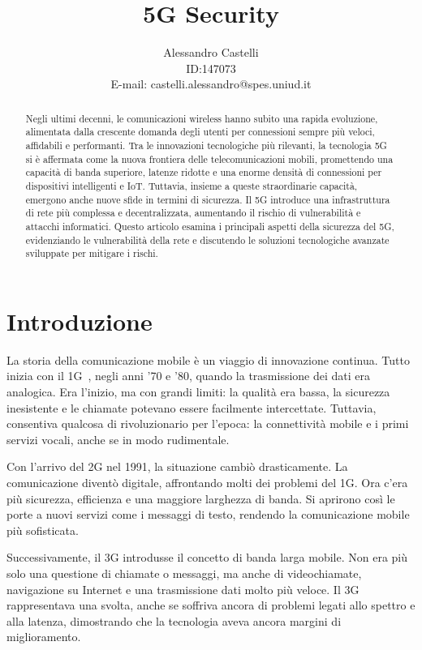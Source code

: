 \documentclass[english]{article}
\title{5G Security}
\author{Alessandro Castelli \\ ID:\@147073 \\ E-mail: castelli.alessandro@spes.uniud.it}
\begin{document}
\maketitle

\begin{abstract}
	Negli ultimi decenni, le comunicazioni wireless hanno subito una rapida
	evoluzione, alimentata dalla crescente domanda degli utenti per connessioni
	sempre più veloci, affidabili e performanti. Tra le innovazioni tecnologiche
	più rilevanti, la tecnologia 5G si è affermata come la nuova frontiera delle
	telecomunicazioni mobili, promettendo una capacità di banda superiore,
	latenze ridotte e una enorme densità di connessioni per dispositivi
	intelligenti e IoT. Tuttavia, insieme a queste straordinarie capacità,
	emergono anche nuove sfide in termini di sicurezza. Il 5G introduce una
	infrastruttura di rete più complessa e decentralizzata, aumentando il rischio
	di vulnerabilità e attacchi informatici. Questo articolo esamina i principali
	aspetti della sicurezza del 5G, evidenziando le vulnerabilità della rete e
	discutendo le soluzioni tecnologiche avanzate sviluppate per mitigare i rischi.
\end{abstract}

\clearpage

\tableofcontents
\newpage
\section{Introduzione}

La storia della comunicazione mobile è un viaggio di innovazione continua.
Tutto inizia con il 1G~\cite{dangi2021study}, negli anni '70 e '80, quando la
trasmissione dei dati era analogica. Era l'inizio, ma con grandi limiti: la
qualità era bassa, la sicurezza inesistente e le chiamate potevano essere
facilmente intercettate. Tuttavia, consentiva qualcosa di rivoluzionario per
l'epoca: la connettività mobile e i primi servizi vocali, anche se in modo
rudimentale.

Con l'arrivo del 2G nel 1991, la situazione cambiò drasticamente. La
comunicazione diventò digitale, affrontando molti dei problemi del 1G. Ora
c'era più sicurezza, efficienza e una maggiore larghezza di banda. Si aprirono
così le porte a nuovi servizi come i messaggi di testo, rendendo la
comunicazione mobile più sofisticata.

Successivamente, il 3G introdusse il concetto di banda larga mobile. Non era
più solo una questione di chiamate o messaggi, ma anche di videochiamate,
navigazione su Internet e una trasmissione dati molto più veloce. Il 3G
rappresentava una svolta, anche se soffriva ancora di problemi legati allo
spettro e alla latenza, dimostrando che la tecnologia aveva ancora margini di
miglioramento.
\end{document}
